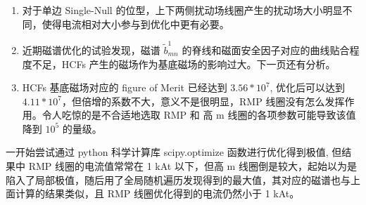   \begin{enumerate}
    \item 对于单边 Single-Null 的位型，上下两侧扰动场线圈产生的扰动场大小明显不同，使得电流相对大小参与到优化中更有必要。
    \item 近期磁谱优化的试验发现，磁谱 $\tilde{b}^1_{mn}$ 的脊线和磁面安全因子对应的曲线贴合程度不足，HCFs 产生的磁场作为基底磁场的影响过大。下一页还有分析。
    \item HCFs 基底磁场对应的 figure of Merit 已经达到 $3.56 * 10^7$, 优化后可以达到 $4.11 * 10^7$，但倍增的系数不大，意义不是很明显，RMP 线圈没有怎么发挥作用。令人吃惊的是不合适地选取 RMP 和 高 m 线圈的各项参数可能导致该值降到 $10^5$ 的量级。 
  \end{enumerate}
  


  





  \begin{figure}[t]
    \centering
    \hfill
  \end{figure}
  


  
  一开始尝试通过 python 科学计算库 scipy.optimize 函数进行优化得到极值, 但结果中 RMP 线圈的电流值常常在 1 kAt 以下，但高 m 线圈倒是较大，起始以为是陷入了局部极值，随后用了全局随机遍历发现得到的最大值，其对应的磁谱也与上面计算的结果类似，且 RMP 线圈优化得到的电流仍然小于 1 kAt。
  
  

  \begin{figure}[t]
    \centering
    \hfill
  \end{figure}
  

